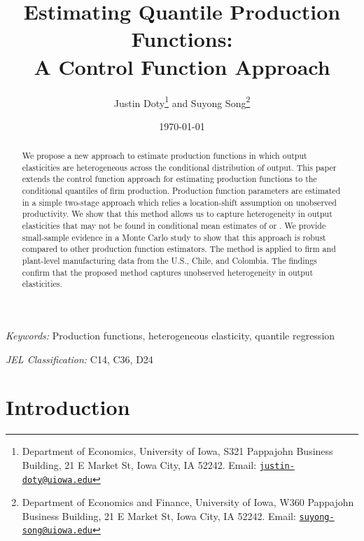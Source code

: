 \documentclass[12pt]{article}
\begin{document}
\title{Estimating Quantile Production Functions: \\
A Control Function Approach}

\author{Justin Doty\thanks{Department of Economics, University of Iowa, S321 Pappajohn Business Building, 21 E Market St, Iowa City, IA 52242. Email: \href{mailto:justin-doty@uiowa.edu}{\texttt{justin-doty@uiowa.edu}}} and Suyong Song\thanks{Department of Economics and Finance, University of Iowa, W360 Pappajohn Business Building, 21 E Market St, Iowa City, IA 52242. Email: \href{mailto:suyong-song@uiowa.edu}{\texttt{suyong-song@uiowa.edu}}}
}

\date {\today}
\maketitle


\begin{abstract}
We propose a new approach to estimate production functions in which output elasticities are heterogeneous across the conditional distribution of output. This paper extends the control function approach for estimating production functions to the conditional quantiles of firm production. Production function parameters are estimated in a simple two-stage approach which relies a location-shift assumption on unobserved productivity. We show that this method allows us to capture heterogeneity in output elasticities that may not be found in conditional mean estimates of \cite{Ackerberg2015} or \cite{Levinsohn2003}. We provide small-sample evidence in a Monte Carlo study to show that this approach is robust compared to other production function estimators. The method is applied to firm and plant-level manufacturing data from the U.S., Chile, and Colombia. The findings confirm that the proposed method captures unobserved heterogeneity in output elasticities.
\end{abstract}


\textit{Keywords:} Production functions, heterogeneous elasticity, quantile regression

\textit{JEL Classification:} C14, C36, D24



\baselineskip25pt

\onehalfspacing

\section{Introduction}
\end{document}

